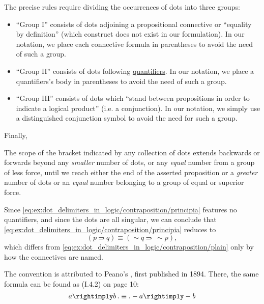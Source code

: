 \begin{example}
\begin{thmenum}
    The precise rules require dividing the occurrences of dots into three groups:
    \begin{itemize}
      \item \enquote{Group I} consists of dots adjoining a propositional connective or \enquote{equality by definition} (which construct does not exist in our formulation). In our notation, we place each connective formula in parentheses to avoid the need of such a group.

      \item \enquote{Group II} consists of dots following \hyperref[def:predicate_logic_alphabet/quantifiers]{quantifiers}. In our notation, we place a quantifiers's body in parentheses to avoid the need of such a group.

      \item \enquote{Group III} consists of dots which \enquote{stand between propositions in order to indicate a logical product} (i.e. a conjunction). In our notation, we simply use a distinguished conjunction symbol to avoid the need for such a group.
    \end{itemize}

    Finally,
    \begin{displayquote}
      The scope of the bracket indicated by any collection of dots extends backwards or forwards beyond any \textit{smaller} number of dots, or any \textit{equal} number from a group of less force, until we reach either the end of the asserted proposition or a \textit{greater} number of dots or an \textit{equal} number belonging to a group of equal or superior force.
    \end{displayquote}

    Since \eqref{eq:ex:dot_delimiters_in_logic/contraposition/principia} features no quantifiers, and since the dots are all singular, we can conclude that \eqref{eq:ex:dot_delimiters_in_logic/contraposition/principia} reduces to
    \begin{equation}\label{eq:ex:dot_delimiters_in_logic/contraposition/principia_parens}
      (p \rightimply q) \equiv (\sim q \rightimply \ \sim p),
    \end{equation}
    which differs from \eqref{eq:ex:dot_delimiters_in_logic/contraposition/plain} only by how the connectives are named.

    The convention is attributed to Peano's \cite{Peano1908FormulatioMathematico}, first published in 1894. There, the same formula can be found as (I.4.2) on page 10:
    \begin{equation}\label{eq:ex:dot_delimiters_in_logic/contraposition/peano}
      a \rightimply b \qdot \equiv \qdot - a \rightimply - b
    \end{equation}


\end{thmenum}
\end{example}
